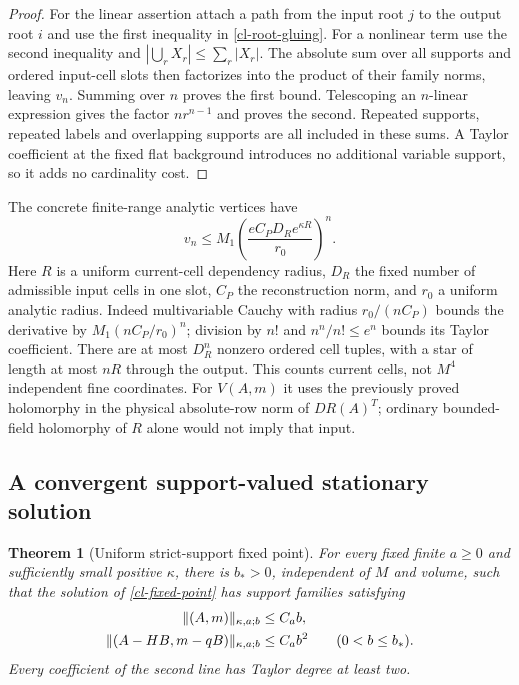 \documentclass[11pt]{article}
\newtheorem{theorem}{Theorem}[section]
\theoremstyle{remark}
\begin{document}
\begin{proof}
For the linear assertion attach a path from the input root $j$ to the
output root $i$ and use the first inequality in
\eqref{cl-root-gluing}. For a nonlinear term use the second inequality
and
$|\bigcup_rX_r|\le\sum_r|X_r|$.
The absolute sum over all supports and ordered input-cell slots then
factorizes into the product of their family norms, leaving $v_n$.
Summing over $n$ proves the first bound. Telescoping an $n$-linear
expression gives the factor $n r^{n-1}$ and proves the second.
Repeated supports, repeated labels and overlapping supports are all
included in these sums. A Taylor coefficient at the fixed flat
background introduces no additional variable support, so it adds no
cardinality cost.
\end{proof}

The concrete finite-range analytic vertices have
\begin{equation}
 v_n\le M_1
       \left(\frac{eC_PD_Re^{\kappa R}}{r_0}\right)^n.        \label{cl-local-cauchy}
\end{equation}
Here $R$ is a uniform current-cell dependency radius, $D_R$ the fixed
number of admissible input cells in one slot, $C_P$ the reconstruction
norm, and $r_0$ a uniform analytic radius. Indeed multivariable Cauchy
with radius $r_0/(nC_P)$ bounds the derivative by
$M_1(nC_P/r_0)^n$; division by $n!$ and $n^n/n!\le e^n$ bounds its
Taylor coefficient. There are at most $D_R^n$ nonzero ordered cell
tuples, with a star of length at most $nR$ through the output.
This counts current cells, not $M^4$ independent fine coordinates.
For $V(A,m)$ it uses the previously proved holomorphy in the physical
absolute-row norm of $DR(A)^T$; ordinary bounded-field holomorphy of
$R$ alone would not imply that input.

\subsection{A convergent support-valued stationary solution}
\label{cl-contraction-section}

\begin{theorem}[Uniform strict-support fixed point]
\label{cl-fixed-point-theorem}
For every fixed finite $a\ge0$ and sufficiently small positive
$\kappa$, there is $b_*>0$, independent of $M$ and volume, such that
the solution of \eqref{cl-fixed-point} has support families satisfying
\begin{align}
 \|(A,m)\|_{\kappa,a;b}&\le C_a b,\notag\\
 \|(A-HB,m-qB)\|_{\kappa,a;b}&\le C_a b^2
 \qquad(0<b\le b_*).                                      \label{cl-solution-bound}
\end{align}
Every coefficient of the second line has Taylor degree at least two.
\end{theorem}
\end{document}
